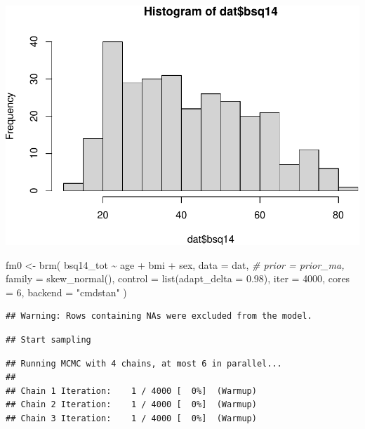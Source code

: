 \documentclass[
]{article}
\newenvironment{Shaded}{\begin{snugshade}}{\end{snugshade}}
\newcommand{\AttributeTok}[1]{\textcolor[rgb]{0.77,0.63,0.00}{#1}}
\newcommand{\CommentTok}[1]{\textcolor[rgb]{0.56,0.35,0.01}{\textit{#1}}}
\newcommand{\DecValTok}[1]{\textcolor[rgb]{0.00,0.00,0.81}{#1}}
\newcommand{\FloatTok}[1]{\textcolor[rgb]{0.00,0.00,0.81}{#1}}
\newcommand{\FunctionTok}[1]{\textcolor[rgb]{0.00,0.00,0.00}{#1}}
\newcommand{\NormalTok}[1]{#1}
\newcommand{\OtherTok}[1]{\textcolor[rgb]{0.56,0.35,0.01}{#1}}
\newcommand{\SpecialCharTok}[1]{\textcolor[rgb]{0.00,0.00,0.00}{#1}}
\newcommand{\StringTok}[1]{\textcolor[rgb]{0.31,0.60,0.02}{#1}}
\begin{document}
\includegraphics{050_quest_groups_files/figure-latex/unnamed-chunk-2-12.pdf}

\begin{Shaded}
\begin{Highlighting}[]
\NormalTok{fm0 }\OtherTok{\textless{}{-}} \FunctionTok{brm}\NormalTok{(}
\NormalTok{  bsq14\_tot }\SpecialCharTok{\textasciitilde{}}\NormalTok{ age }\SpecialCharTok{+}\NormalTok{ bmi }\SpecialCharTok{+}\NormalTok{ sex,}
  \AttributeTok{data =}\NormalTok{ dat, }
  \CommentTok{\# prior = prior\_ma,}
  \AttributeTok{family =} \FunctionTok{skew\_normal}\NormalTok{(),}
  \AttributeTok{control =} \FunctionTok{list}\NormalTok{(}\AttributeTok{adapt\_delta =} \FloatTok{0.98}\NormalTok{),}
  \AttributeTok{iter =} \DecValTok{4000}\NormalTok{,}
  \AttributeTok{cores =} \DecValTok{6}\NormalTok{,}
  \AttributeTok{backend =} \StringTok{"cmdstan"}
\NormalTok{)}
\end{Highlighting}
\end{Shaded}

\begin{verbatim}
## Warning: Rows containing NAs were excluded from the model.
\end{verbatim}

\begin{verbatim}
## Start sampling
\end{verbatim}

\begin{verbatim}
## Running MCMC with 4 chains, at most 6 in parallel...
## 
## Chain 1 Iteration:    1 / 4000 [  0%]  (Warmup) 
## Chain 2 Iteration:    1 / 4000 [  0%]  (Warmup) 
## Chain 3 Iteration:    1 / 4000 [  0%]  (Warmup)
\end{verbatim}
\end{document}
